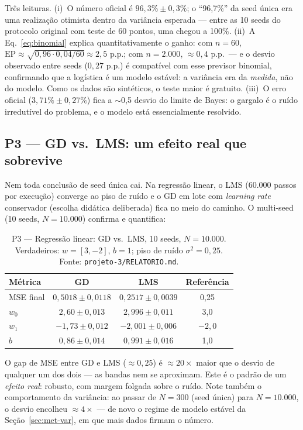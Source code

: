\documentclass[12pt]{article}
\begin{document}
Três leituras. (i)~O número oficial é $96{,}3\% \pm 0{,}3\%$; o ``96{,}7\%''
da seed única era uma realização otimista dentro da variância esperada ---
entre as 10 seeds do protocolo original com teste de 60 pontos, uma chegou a
100\%. (ii)~A Eq.~\eqref{eq:binomial} explica quantitativamente o ganho: com
$n=60$, $\mathrm{EP} \approx \sqrt{0{,}96 \cdot 0{,}04/60} \approx 2{,}5$
p.p.; com $n=2.000$, $\approx 0{,}4$ p.p.\ --- e o desvio observado entre
seeds ($0{,}27$ p.p.) é compatível com esse previsor binomial, confirmando
que a logística é um modelo estável: a variância era da \emph{medida}, não do
modelo. Como os dados são sintéticos, o teste maior é gratuito. (iii)~O erro
oficial ($3{,}71\% \pm 0{,}27\%$) fica a $\sim$0,5 desvio do limite de Bayes:
o gargalo é o ruído irredutível do problema, e o modelo está essencialmente
resolvido.

\subsection{P3 --- GD vs.\ LMS: um efeito real que sobrevive}
\label{sec:res-p3}

Nem toda conclusão de seed única cai. Na regressão linear, o LMS (60.000
passos por execução) converge ao piso de ruído e o GD em lote com
\emph{learning rate} conservador (escolha didática deliberada) fica no meio
do caminho. O multi-seed (10 seeds, $N=10.000$) confirma e quantifica:

\begin{table}[htb]
\centering
\caption{P3 --- Regressão linear: GD vs.\ LMS, 10 seeds, $N=10.000$.
Verdadeiros: $w = [3, -2]$, $b = 1$; piso de ruído $\sigma^2 = 0{,}25$.
Fonte: \texttt{projeto-3/RELATORIO.md}.}
\label{tab:p3}
\begin{tabular}{lccc}
\toprule
Métrica & GD & LMS & Referência \\
\midrule
MSE final & $0{,}5018 \pm 0{,}0118$ & $0{,}2517 \pm 0{,}0039$ & 0{,}25 \\
$w_0$     & $2{,}60 \pm 0{,}013$    & $2{,}996 \pm 0{,}011$   & 3{,}0 \\
$w_1$     & $-1{,}73 \pm 0{,}012$   & $-2{,}001 \pm 0{,}006$  & $-2{,}0$ \\
$b$       & $0{,}86 \pm 0{,}014$    & $0{,}991 \pm 0{,}016$   & 1{,}0 \\
\bottomrule
\end{tabular}
\end{table}

O gap de MSE entre GD e LMS ($\approx 0{,}25$) é $\approx 20\times$ maior que
o desvio de qualquer um dos dois --- as bandas nem se aproximam. Este é o
padrão de um \emph{efeito real}: robusto, com margem folgada sobre o ruído.
Note também o comportamento da variância: ao passar de $N=300$ (seed única)
para $N=10.000$, o desvio encolheu $\approx 4\times$ --- de novo o regime de
modelo estável da Seção~\ref{sec:met-var}, em que mais dados firmam o número.
\end{document}
